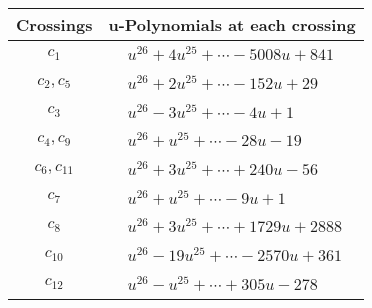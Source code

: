 \documentclass[1p]{elsarticle_modified}
\theoremstyle{definition}
\begin{document}
\begin{tabular}{m{50pt}|m{274pt}}
Crossings & \hspace{64pt}u-Polynomials at each crossing \\
\hline $$\begin{aligned}c_{1}\end{aligned}$$&$\begin{aligned}
&u^{26}+4 u^{25}+\cdots-5008 u+841
\end{aligned}$\\
\hline $$\begin{aligned}c_{2},c_{5}\end{aligned}$$&$\begin{aligned}
&u^{26}+2 u^{25}+\cdots-152 u+29
\end{aligned}$\\
\hline $$\begin{aligned}c_{3}\end{aligned}$$&$\begin{aligned}
&u^{26}-3 u^{25}+\cdots-4 u+1
\end{aligned}$\\
\hline $$\begin{aligned}c_{4},c_{9}\end{aligned}$$&$\begin{aligned}
&u^{26}+u^{25}+\cdots-28 u-19
\end{aligned}$\\
\hline $$\begin{aligned}c_{6},c_{11}\end{aligned}$$&$\begin{aligned}
&u^{26}+3 u^{25}+\cdots+240 u-56
\end{aligned}$\\
\hline $$\begin{aligned}c_{7}\end{aligned}$$&$\begin{aligned}
&u^{26}+u^{25}+\cdots-9 u+1
\end{aligned}$\\
\hline $$\begin{aligned}c_{8}\end{aligned}$$&$\begin{aligned}
&u^{26}+3 u^{25}+\cdots+1729 u+2888
\end{aligned}$\\
\hline $$\begin{aligned}c_{10}\end{aligned}$$&$\begin{aligned}
&u^{26}-19 u^{25}+\cdots-2570 u+361
\end{aligned}$\\
\hline $$\begin{aligned}c_{12}\end{aligned}$$&$\begin{aligned}
&u^{26}- u^{25}+\cdots+305 u-278
\end{aligned}$\\
\hline
\end{tabular}\\~\\
\end{document}
